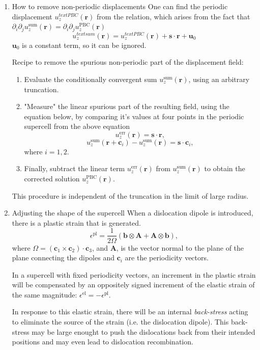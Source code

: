 \documentclass[11pt]{article}
\begin{document}
\begin{enumerate}
\begin{enumerate}
\item How to remove non-periodic displacements
\label{sec:org417e06a}
One can find the periodic displacement \(u_{z}^{text{PBC}}(\mathbf{r})\)
from the relation, which arises from the fact that
\(\partial_{i}\partial_{j}u_{z}^{\text{sum}}(\mathbf{r}) = \partial_{i}\partial_{j}u_{z}^{\text{PBC}}(\mathbf{r})\)
\[ u_{z}^{text{sum}}(\mathbf{r}) =  u_{z}^{text{PBC}}(\mathbf{r}) +
     \mathbf{s}\cdot\mathbf{r} + \mathbf{u}_{0} \]
\(\mathbf{u}_{0}\) is a constant term, so it can be ignored. 

Recipe to remove the spurious non-periodic part of the displacement field:
\begin{enumerate}
\item Evaluate the conditionally convergent sum
\(u_{z}^{\text{sum}}(\mathbf{r})\), using an arbitrary truncation.
\item "Measure" the linear spurious part of the resulting field, using the
equation below, by comparing it's values at four points in the
periodic supercell from the above equation 
\[ u_{z}^{\text{err}}(\mathbf{r}) =  \mathbf{s}\cdot\mathbf{r},  \]
\[ u_{z}^{\text{sum}}(\mathbf{r} + \mathbf{c}_{i})  -
        u_{z}^{\text{sum}}(\mathbf{r}) = \mathbf{s}\cdot\mathbf{c}_{i}, \]
where \(i=1,2\).
\item Finally, subtract the linear term \(u_{z}^{\text{err}}(\mathbf{r})\) from
\(u_{z}^{\text{sum}}(\mathbf{r})\) to obtain the corrected solution
\(u_{z}^{\text{PBC}}(\mathbf{r})\).
\end{enumerate}


This procedure is independent of the truncation in the limit of large
radius.

\item Adjusting the shape of the supercell
\label{sec:orgb952698}
When a dislocation dipole is introduced, there is a plastic strain that
is generated. 
\[ \epsilon^{\text{pl}} = \frac{1}{2\Omega}( \mathbf{b} \otimes
     \mathbf{A} + \mathbf{A} \otimes \mathbf{b} ), \]
where \(\Omega = (\mathbf{c}_{1} \times \mathbf{c}_{2}) \cdot
     \mathbf{c}_{3}\), and \(\mathbf{A}\), is the vector normal to the plane of
the plane connecting the dipoles and \(\mathbf{c}_{i}\) are the periodicity vectors. 

In a supercell with fixed periodicity vectors, an increment in the
plastic strain will be compensated by an oppositely signed increment of
the elastic strain of the same magnitude: \(\epsilon^{\text{el}} = -
     \epsilon^{\text{pl}}\).

In response to this elastic strain, there will be an internal
\emph{back-stress} acting to eliminate the source of the strain (i.e. the
dislocation dipole). This back-stress may be large enought to push the
dislocations back from their intended positions and may even lead to
dislocation recombination. 


\end{enumerate}
\end{enumerate}
\end{document}
